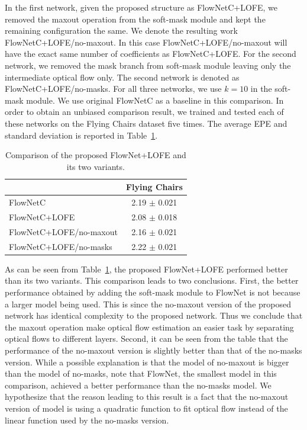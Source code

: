 \documentclass[10pt,twocolumn,letterpaper]{article}
\begin{document}
In the first network, given the proposed structure as FlowNetC+LOFE, we removed the maxout operation from the soft-mask module and kept the remaining configuration the same. We denote the resulting work FlowNetC+LOFE/no-maxout. In this case FlowNetC+LOFE/no-maxout will have the exact same number of coefficients as FlowNetC+LOFE. For the second network, we  removed the mask branch from soft-mask module leaving only the intermediate optical flow only. The second network is denoted as FlowNetC+LOFE/no-masks. For all three networks, we use $k=10$ in the soft-mask module. We use original FlowNetC as a baseline in this comparison. In order to obtain an unbiased comparison result, we trained and tested each of these networks on the Flying Chairs dataset five times. The average EPE and standard deviation is reported in Table~\ref{tab: flownet variants}.

\begin{table}[]
\centering
\caption{Comparison of the proposed FlowNet+LOFE and its two variants.}
\label{tab: flownet variants}
\begin{tabular}{lc}
\hline
\hline
                         & Flying Chairs \\ \hline
FlowNetC                 & 2.19 $\pm$ 0.021            \\
FlowNetC+LOFE            & 2.08 $\pm$ 0.018            \\
FlowNetC+LOFE/no-maxout  & 2.16 $\pm$ 0.021            \\
FlowNetC+LOFE/no-masks   & 2.22 $\pm$ 0.021            \\
\hline
\end{tabular}
\end{table}

As can be seen from Table~\ref{tab: flownet variants}, the proposed FlowNet+LOFE performed better than its two variants. This comparison leads to two conclusions. First, the better performance obtained by adding the soft-mask module to FlowNet is not because a larger model being used. This is since the no-maxout version of the proposed network has identical complexity to the proposed network. Thus we conclude that the maxout operation make optical flow estimation an easier task by separating optical flows to different layers. Second, it can be seen from the table that the performance of the no-maxout version is slightly better than that of the no-masks version. While a possible explanation is that the model of no-maxout is bigger than the model of no-masks, note that FlowNet, the smallest model in this comparison, achieved a better performance than the no-masks model. We hypothesize that the reason leading to this result is a fact that the no-maxout version of model is using a quadratic function to fit optical flow instead of the linear function used by the no-masks version. 
\end{document}
